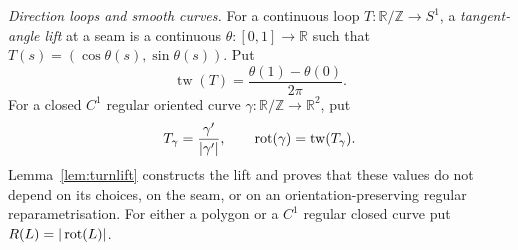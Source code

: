 \begin{definition}
\emph{Direction loops and smooth curves.}
For a continuous loop $T\colon\mathbb R/\mathbb Z\to S^1$, a
\emph{tangent-angle lift} at a seam is a continuous
$\theta\colon[0,1]\to\mathbb R$ such that
$T(s)=(\cos\theta(s),\sin\theta(s))$. Put
\[
   \operatorname{tw}(T)=\frac{\theta(1)-\theta(0)}{2\pi}.
\]
For a closed $C^1$ regular oriented curve
$\gamma\colon\mathbb R/\mathbb Z\to\mathbb R^2$, put
\[
   T_\gamma=\frac{\gamma'}{|\gamma'|},
   \qquad
   \operatorname{rot}(\gamma)=\operatorname{tw}(T_\gamma).
\]
Lemma~\ref{lem:turnlift} constructs the lift and proves that these values do
not depend on its choices, on the seam, or on an orientation-preserving regular
reparametrisation. For either a polygon or a $C^1$ regular closed curve put
$R(L)=|\operatorname{rot}(L)|$.

\end{definition}

